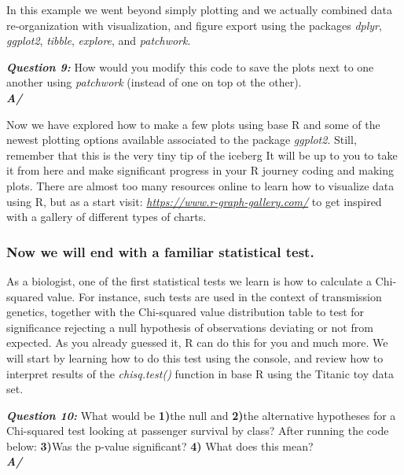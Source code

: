 \documentclass[]{article}
\newenvironment{Shaded}{\begin{snugshade}}{\end{snugshade}}
\newcommand{\CommentTok}[1]{\textcolor[rgb]{0.56,0.35,0.01}{\textit{#1}}}
\newcommand{\KeywordTok}[1]{\textcolor[rgb]{0.13,0.29,0.53}{\textbf{#1}}}
\newcommand{\NormalTok}[1]{#1}
\newcommand{\OperatorTok}[1]{\textcolor[rgb]{0.81,0.36,0.00}{\textbf{#1}}}
\begin{document}
In this example we went beyond simply plotting and we actually combined
data re-organization with visualization, and figure export using the
packages \emph{dplyr}, \emph{ggplot2}, \emph{tibble}, \emph{explore},
and \emph{patchwork}.

\textbf{\emph{Question 9:}} How would you modify this code to save the
plots next to one another using \emph{patchwork} (instead of one on top
ot the other).\\
\textbf{\emph{A/}}

Now we have explored how to make a few plots using base R and some of
the newest plotting options available associated to the package
\emph{ggplot2}. Still, remember that this is the very tiny tip of the
iceberg It will be up to you to take it from here and make significant
progress in your R journey coding and making plots. There are almost too
many resources online to learn how to visualize data using R, but as a
start visit: \emph{\url{https://www.r-graph-gallery.com/}} to get
inspired with a gallery of different types of charts.

\hypertarget{now-we-will-end-with-a-familiar-statistical-test.}{%
\subsubsection{Now we will end with a familiar statistical
test.}\label{now-we-will-end-with-a-familiar-statistical-test.}}

As a biologist, one of the first statistical tests we learn is how to
calculate a Chi-squared value. For instance, such tests are used in the
context of transmission genetics, together with the Chi-squared value
distribution table to test for significance rejecting a null hypothesis
of observations deviating or not from expected. As you already guessed
it, R can do this for you and much more. We will start by learning how
to do this test using the console, and review how to interpret results
of the \emph{chisq.test()} function in base R using the Titanic toy data
set.

\textbf{\emph{Question 10:}} What would be \textbf{1)}the null and
\textbf{2)}the alternative hypotheses for a Chi-squared test looking at
passenger survival by class? After running the code below:
\textbf{3)}Was the p-value significant? \textbf{4)} What does this
mean?\\
\textbf{\emph{A/}}

\begin{Shaded}
\end{Shaded}
\end{document}
